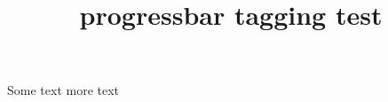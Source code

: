 \documentclass{article}
\title{progressbar tagging test}
\begin{document}
Some text  more text
\end{document}
